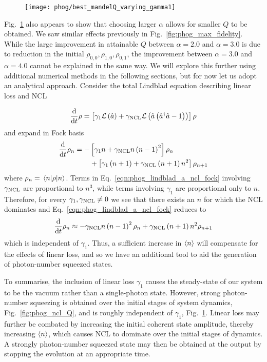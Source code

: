 \begin{figure}
\centering
\texttt{[image: phog/best\_mandelQ\_varying\_gamma1]}
\caption{\label{fig:phog_ncl_best_Q_gamma1}}
\end{figure}

Fig.~\ref{fig:phog_ncl_best_Q_gamma1} also appears to show that choosing larger $\alpha$ allows for smaller $Q$ to be obtained. We saw similar effects previously in Fig.~\ref{fig:phog_max_fidelity}. While the large improvement in attainable $Q$ between $\alpha=2.0$ and $\alpha=3.0$ is due to reduction in the initial $\rho_{0, 0}, \rho_{1, 0}, \rho_{0, 1}$, the improvement between $\alpha=3.0$ and $\alpha=4.0$ cannot be explained in the same way. We will explore this further using additional numerical methods in the following sections, but for now let us adopt an analytical approach. Consider the total Lindblad equation describing linear loss and NCL

\begin{equation}\label{eqn:phog_lindblad_a_ncl_2}
\frac{\mathrm{d}}{\mathrm{d}t} \rho = \left[ \gamma_1 \mathcal{L}\left(\hat{a}\right) + \gamma_{\text{NCL}} \mathcal{L}\left(\hat{a}\left(\hat{a}^\dagger \hat{a} - 1\right)\right)\right] \rho
\end{equation}
and expand in Fock basis
\begin{align}\label{eqn:phog_lidnblad_a_ncl_fock}
\ddt \rho_{n} = - &\left[ \gamma_1 n + \gncl n \left(n - 1\right)^2 \right] \rho_n \notag \\
%
&+\left[ \gamma_1 \left(n+1\right) + \gncl \left(n+1\right) n^2 \right] \rho_{n+1}
\end{align}
where $\rho_n = \ev{\rho}{n}$. Terms in Eq.~\ref{eqn:phog_lindblad_a_ncl_fock} involving $\gamma_{\text{NCL}}$ are proportional to $n^3$, while terms involving $\gamma_1$ are proportional only to $n$. Therefore, for every $\gamma_1, \gamma_{\text{NCL}}  \ne 0$ we see that there exists an $n$ for which the NCL dominates and Eq.~\ref{eqn:phog_lindblad_a_ncl_fock} reduces to
\begin{equation}
\frac{\mathrm{d}}{\mathrm{d}t} \rho_n \approx - \gamma_{\text{NCL}} n \left(n-1\right)^2 \rho_n + \gamma_{\text{NCL}} \left(n+1\right)n^2 \rho_{n+1}
\end{equation}
which is independent of $\gamma_1$. Thus, a sufficient increase in $\ev{n}$ will compensate for the effects of linear loss, and so we have an additional tool to aid the generation of photon-number squeezed states.

To summarise, the inclusion of linear loss $\gamma_1$ causes the steady-state of our system to be the vacuum rather than a single-photon state. However, strong photon-number squeezing is obtained over the initial stages of system dynamics, Fig.~\ref{fig:phog_ncl_Q}, and is roughly independent of $\gamma_1$, Fig.~\ref{fig:phog_ncl_best_Q_gamma1}. Linear loss may further be combated by increasing the initial coherent state amplitude, thereby increasing $\ev{n}$, which causes NCL to dominate over the initial stages of dynamics. A strongly photon-number squeezed state may then be obtained at the output by stopping the evolution at an appropriate time.

